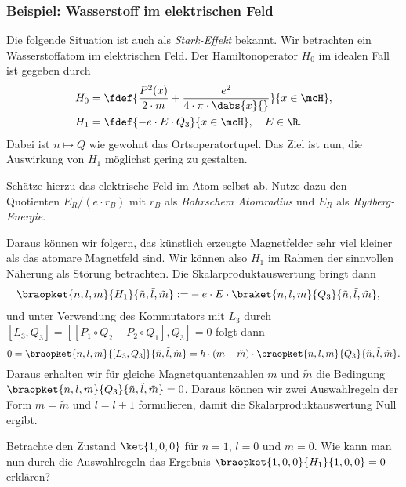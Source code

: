 \documentclass{subfiles}
\begin{document}

    \subsubsection*{Beispiel: Wasserstoff im elektrischen Feld}
        Die folgende Situation ist auch als \emph{Stark-Effekt} bekannt. Wir betrachten ein Wasserstoffatom im elektrischen Feld. Der Hamiltonoperator $H_0$ im idealen Fall ist gegeben durch 
        \begin{align*}
            H_0 &= \fdef{\frac{P^2(x)}{2\cdot m} + \frac{e^2}{4\cdot\pi\cdot\dabs{x}{}}}{x\in\mcH}, \\
            H_1 &= \fdef{-e\cdot E\cdot Q_3}{x\in\mcH},\quad E\in\R.
        \end{align*}
        Dabei ist $n\mapsto Q$ wie gewohnt das Ortsoperatortupel. Das Ziel ist nun, die Auswirkung von $H_1$ möglichst gering zu gestalten. 
        \begin{Aufgabe}
            \nr{} Schätze hierzu das elektrische Feld im Atom selbst ab. Nutze dazu den Quotienten $E_R/(e\cdot r_B)$ mit $r_B$ als \emph{Bohrschem Atomradius} und $E_R$ als \emph{Rydberg-Energie}.
        \end{Aufgabe}
        \noindent Daraus können wir folgern, das künstlich erzeugte Magnetfelder sehr viel kleiner als das atomare Magnetfeld sind. Wir können also $H_1$ im Rahmen der sinnvollen Näherung als Störung betrachten. Die Skalarproduktauswertung bringt dann 
        \begin{align*}
            \braopket{n,l,m}{H_1}{\tilde n,\tilde l, \tilde m} :=& -e\cdot E\cdot \braket{n,l,m}{Q_3}{\tilde n,\tilde l, \tilde m}, 
        \end{align*}
        und unter Verwendung des Kommutators mit $L_3$ durch $[L_3,Q_3] = [[P_1\circ Q_2 - P_2\circ Q_1],Q_3] = 0$ folgt dann 
        \[
            0 = \braopket{n,l,m}{[L_3,Q_3]}{\tilde n,\tilde l, \tilde m} = \hbar\cdot (m-\tilde m)\cdot \braopket{n,l,m}{Q_3}{\tilde n,\tilde l, \tilde m}.
        \]
        Daraus erhalten wir für gleiche Magnetquantenzahlen $m$ und $\tilde m$ die Bedingung $\braopket{n,l,m}{Q_3}{\tilde n,\tilde l, \tilde m} = 0$. Daraus können wir zwei Auswahlregeln der Form $m = \tilde m$ und $\tilde l = l \pm 1$ formulieren, damit die Skalarproduktauswertung Null ergibt. 
        \begin{Aufgabe}
            \nr{} Betrachte den Zustand $\ket{1,0,0}$ für $n = 1$, $l = 0$ und $m = 0$. Wie kann man nun durch die Auswahlregeln das Ergebnis $\braopket{1,0,0}{H_1}{1,0,0} = 0$ erklären?
        \end{Aufgabe}
\end{document}
